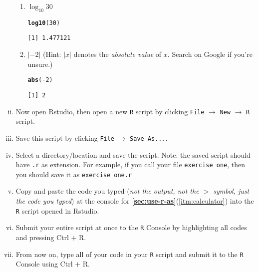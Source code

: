 \documentclass[12pt,a4paper]{article}\usepackage[]{graphicx}\usepackage[]{color}
\makeatletter
\newcommand{\hlnum}[1]{\textcolor[rgb]{0.686,0.059,0.569}{#1}}%
\newcommand{\hlopt}[1]{\textcolor[rgb]{0,0,0}{#1}}%
\newcommand{\hlstd}[1]{\textcolor[rgb]{0.345,0.345,0.345}{#1}}%
\newcommand{\hlkwd}[1]{\textcolor[rgb]{0.737,0.353,0.396}{\textbf{#1}}}%
\newenvironment{kframe}{%
 \def\at@end@of@kframe{}%
 \ifinner\ifhmode%
  \def\at@end@of@kframe{\end{minipage}}%
  \begin{minipage}{\columnwidth}%
 \fi\fi%
 \def\FrameCommand##1{\hskip\@totalleftmargin \hskip-\fboxsep
 \colorbox{shadecolor}{##1}\hskip-\fboxsep
     \hskip-\linewidth \hskip-\@totalleftmargin \hskip\columnwidth}%
 \MakeFramed {\advance\hsize-\width
   \@totalleftmargin\z@ \linewidth\hsize
   \@setminipage}}%
 {\par\unskip\endMakeFramed%
 \at@end@of@kframe}
\newenvironment{knitrout}{}{} %
\makeatother
\begin{document}
\begin{enumerate}[(i)]
\begin{enumerate}
  \item $\log_{10}30$
\begin{knitrout}
\color{fgcolor}\begin{kframe}
\begin{alltt}
\hlkwd{log10}\hlstd{(}\hlnum{30}\hlstd{)}
\end{alltt}
\begin{verbatim}
[1] 1.477121
\end{verbatim}
\end{kframe}
\end{knitrout}

  \item $|-2|$ \hspace{0.2cm}(Hint: $|x|$ denotes the \emph{absolute
      value} of $x$. Search on Google if you're unsure.)
\begin{knitrout}
\color{fgcolor}\begin{kframe}
\begin{alltt}
\hlkwd{abs}\hlstd{(}\hlopt{-}\hlnum{2}\hlstd{)}
\end{alltt}
\begin{verbatim}
[1] 2
\end{verbatim}
\end{kframe}
\end{knitrout}

  \end{enumerate}
\item Now open Rstudio, then open a new \texttt{R} script by clicking \texttt{File}
  $\rightarrow$ \texttt{New} $\rightarrow$ \texttt{R} script.
\item Save this script by clicking \texttt{File} $\rightarrow$
  \texttt{Save As...}.
\item Select a directory/location and save the script. Note: the saved
  script should have \texttt{.r} as extension. For example, if you
  call your file \texttt{exercise one}, then you should save it as
  \texttt{exercise one.r}
\item Copy and paste the code you typed (\emph{not the output, not the
  $>$ symbol, just the code you typed}) at the console for {\bf
    \ref{sec:use-r-as}}(\ref{itm:calculator}) into the \texttt{R}
  script opened in Rstudio.
\item Submit your entire script at once to the \texttt{R}
  Console by highlighting all codes and pressing Ctrl $+$ R.
\item From now on, type all of your code in your \texttt{R} script and
  submit it to the \texttt{R} Console using Ctrl $+$ R.

\end{enumerate}
\end{document}
